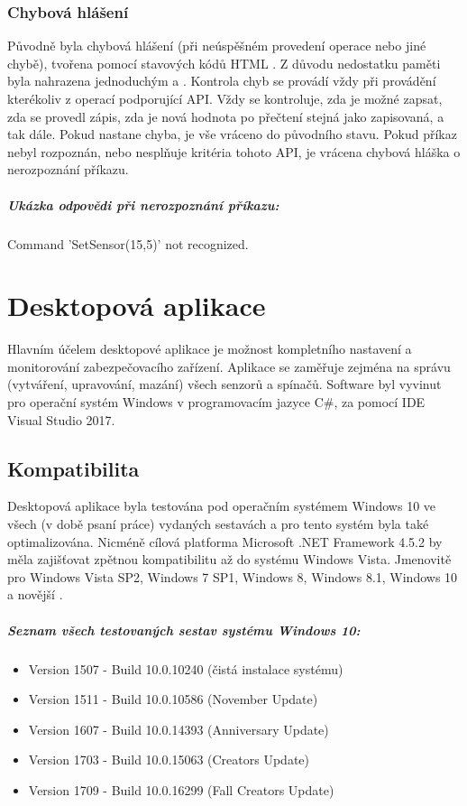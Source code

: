 \documentclass[FM,DP]{tulthesis}  %
\begin{document}
\subsection{Chybová hlášení}
Původně byla chybová hlášení (při neúspěšném provedení operace nebo jiné chybě), tvořena pomocí stavových kódů HTML \cite{HTML1.1}. Z důvodu nedostatku paměti byla nahrazena jednoduchým  a . Kontrola chyb se provádí vždy při provádění kterékoliv z operací podporující API. Vždy se kontroluje, zda je možné zapsat, zda se provedl zápis, zda je nová hodnota po přečtení stejná jako zapisovaná, a tak dále. Pokud nastane chyba, je vše vráceno do původního stavu. Pokud příkaz nebyl rozpoznán, nebo nesplňuje kritéria tohoto API, je vrácena chybová hláška o nerozpoznání příkazu.
\paragraph{Ukázka odpovědi při nerozpoznání příkazu:}
\begin{center}
Command 'SetSensor(15,5)' not recognized.
\end{center} 


\chapter{Desktopová aplikace}
Hlavním účelem desktopové aplikace je možnost kompletního nastavení a monitorování zabezpečovacího zařízení. Aplikace se zaměřuje zejména na správu (vytváření, upravování, mazání) všech senzorů a spínačů. Software byl vyvinut pro operační systém Windows v programovacím jazyce C\#, za pomocí IDE Visual Studio 2017.

\section{Kompatibilita}
Desktopová aplikace byla testována pod operačním systémem Windows 10 ve všech (v době psaní práce) vydaných sestavách a pro tento systém byla také optimalizována. Nicméně cílová platforma Microsoft .NET Framework 4.5.2 \cite{WhatsNew.NetFramework4.5.2} by měla zajišťovat zpětnou kompatibilitu až do systému Windows Vista. Jmenovitě pro Windows Vista SP2, Windows 7 SP1, Windows 8, Windows 8.1, Windows 10 a novější \cite{.NetFramework4.5.2}.

\paragraph{Seznam všech testovaných sestav systému Windows 10:}
\begin{itemize}
\item Version 1507 - Build 10.0.10240 (čistá instalace systému)
\item Version 1511 - Build 10.0.10586 (November Update)
\item Version 1607 - Build 10.0.14393 (Anniversary Update)
\item Version 1703 - Build 10.0.15063 (Creators Update)
\item Version 1709 - Build 10.0.16299 (Fall Creators Update)
\end{itemize}
\end{document}
